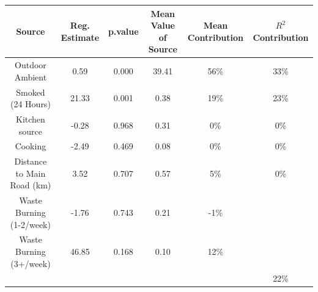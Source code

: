 
\begin{tabular}{cccccc}
\toprule
Source & Reg. Estimate & p.value & Mean Value of Source & Mean Contribution & $R^2$ Contribution\\
\midrule
Outdoor Ambient & 0.59 & 0.000 & 39.41 & 56\% & 33\%\\
Smoked (24 Hours) & 21.33 & 0.001 & 0.38 & 19\% & 23\%\\
Kitchen source & -0.28 & 0.968 & 0.31 & 0\% & 0\%\\
Cooking & -2.49 & 0.469 & 0.08 & 0\% & 0\%\\
Distance to Main Road (km) & 3.52 & 0.707 & 0.57 & 5\% & 0\%\\
\addlinespace
Waste Burning (1-2/week) & -1.76 & 0.743 & 0.21 & -1\% & \\
Waste Burning (3+/week) & 46.85 & 0.168 & 0.10 & 12\% & \\
 &  &  &  &  & 22\%\\
\bottomrule
\end{tabular}

